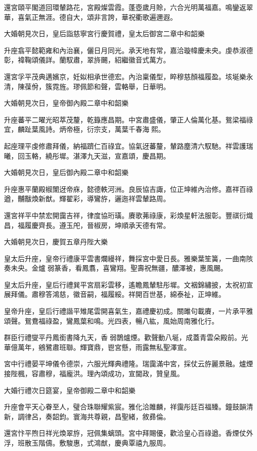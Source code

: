 \begin{pinyinscope}
還宮頤平閣道回環輦路花，宮殿燦雲霞。蓬壺歲月賒，六合光明萬福嘉。鳴鑾返翠華，喜氣正無涯。德自大，頌非言誇，華祝衢歌遍邇遐。

大婚朝見次日，皇后詣慈寧宮行慶賀禮，皇太后御宮二章中和韶樂

升座翕平懿範雍和內治襄，儷日月同光。承天地有常，嘉洽璇幃慶未央。虔恭淑德彰，褘鞠頌儀詳。蘭馭肅，翠旍颺，紹繼徽音式萬方。

還宮孚平茂典邁嬪京，妊姒相承世德宏。內治稟儀型，睟穆慈顏福履盈。垓埏樂永清，陳葆佾，簇霓旌。璆佩節和聲，雲輅舉，日華明。

大婚朝見次日，皇帝御內殿二章中和韶樂

升座蕃平二曜光昭萃茂釐，乾籙應昌期。中宮肅盛儀，肇正人倫萬化基。鴛梁福祿宜，麟趾葉風詩。炳帝極，衍宗支，萬葉千春海熙。

起座理平虔修肅拜儀，納福躋仁百祿宜。協氣迓蕃釐，輦路塵清六馭馳。祥雲護瑞曦，回玉輅，繞彤墀。湛澤九天滋，宣嘉頌，慶昌期。

大婚朝見次日，皇后御內殿二章中和韶樂

升座惠平蘭殿椒闈迓帝庥，懿德軼河洲。良辰協吉諏，位正坤維內治修。嘉祥百祿遒，黼黻煥新猷。輝翟彩，導鸞斿，邐迤祥雲輦路周。

還宮祥平中禁宏開靄吉祥，律度協珩璜。賡歌茀祿康，彩煥星軒法服彰。豐祺衍熾昌，福履慶齊長。遵玉戺，晉椒房，坤順承天德有常。

大婚朝見次日，慶賀五章丹陛大樂

皇太后升座，皇帝行禮康平雲書爛縵祥，舞採宮中愛日長。雅樂葉笙簧，一曲南陔奏未央。金爐弱篆香，看鳳翥，喜鸞翔。聖壽祝無疆，醲澤被，惠風颺。

皇太后升座，皇后行禮巽平宮扇彩雲移，遙瞻鳳輦駐彤墀。文裀錦繡披，太祝初宣展拜儀。肅穆答鴻慈，徽音嗣，福履綏。祥開百世基，綿泰祉，正坤維。

皇帝升座，皇后行禮諧平雉尾雲開喜氣生，嘉禮慶初成。關雎句載賡，一片承平雅頌聲。鴛鴦福祿盈，鸞鳳葉和鳴。光四表，暢八紘，風始周南雅化行。

群臣行禮燮平丹鳳銜書降九天，香弱鵲爐煙。歡聲動八埏，成蓋青雲朵殿前。光華億萬年，鵷鷺肅班聯。輝寶鼎，鬯宮懸，雨露無私聖澤宣。

宮中行禮晏平坤儀令德崇，六服光輝典禮隆。瑞靄滿中宮，採仗云斿麗景融。爐煙接陛楓，容肅穆，福龐洪。理內頌成功，宣閫政，贊皇風。

大婚行禮次日筵宴，皇帝御殿二章中和韶樂

升座會平天心眷至人，璧合珠聯耀紫宸。雅化洽雎麟，祥靄彤廷百福臻。鐘鼓韻清新，調律呂，奏韶鈞。寰海共尊親，昌聖緒，敘彞倫。

還宮忭平煦日祥光煥翠斿，冠佩集螭頭。宮中拜賜優，歡洽皇心百祿遒。香煙仗外浮，班散玉階儔。敷駿惠，式鴻猷，慶典覃禧九服周。


\end{pinyinscope}

